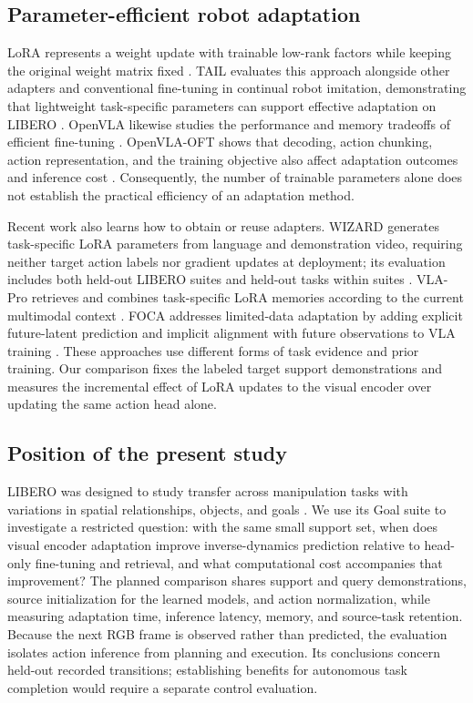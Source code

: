 \documentclass[11pt]{article}
\begin{document}
\subsection*{Parameter-efficient robot adaptation}

LoRA represents a weight update with trainable low-rank factors while keeping the original weight matrix fixed \cite{lora}. TAIL evaluates this approach alongside other adapters and conventional fine-tuning in continual robot imitation, demonstrating that lightweight task-specific parameters can support effective adaptation on LIBERO \cite{tail}. OpenVLA likewise studies the performance and memory tradeoffs of efficient fine-tuning \cite{openvla}. OpenVLA-OFT shows that decoding, action chunking, action representation, and the training objective also affect adaptation outcomes and inference cost \cite{oft}. Consequently, the number of trainable parameters alone does not establish the practical efficiency of an adaptation method.

Recent work also learns how to obtain or reuse adapters. WIZARD generates task-specific LoRA parameters from language and demonstration video, requiring neither target action labels nor gradient updates at deployment; its evaluation includes both held-out LIBERO suites and held-out tasks within suites \cite{wizard}. VLA-Pro retrieves and combines task-specific LoRA memories according to the current multimodal context \cite{vlapro}. FOCA addresses limited-data adaptation by adding explicit future-latent prediction and implicit alignment with future observations to VLA training \cite{foca}. These approaches use different forms of task evidence and prior training. Our comparison fixes the labeled target support demonstrations and measures the incremental effect of LoRA updates to the visual encoder over updating the same action head alone.

\subsection*{Position of the present study}

LIBERO was designed to study transfer across manipulation tasks with variations in spatial relationships, objects, and goals \cite{libero}. We use its Goal suite to investigate a restricted question: with the same small support set, when does visual encoder adaptation improve inverse-dynamics prediction relative to head-only fine-tuning and retrieval, and what computational cost accompanies that improvement? The planned comparison shares support and query demonstrations, source initialization for the learned models, and action normalization, while measuring adaptation time, inference latency, memory, and source-task retention. Because the next RGB frame is observed rather than predicted, the evaluation isolates action inference from planning and execution. Its conclusions concern held-out recorded transitions; establishing benefits for autonomous task completion would require a separate control evaluation.
\end{document}
